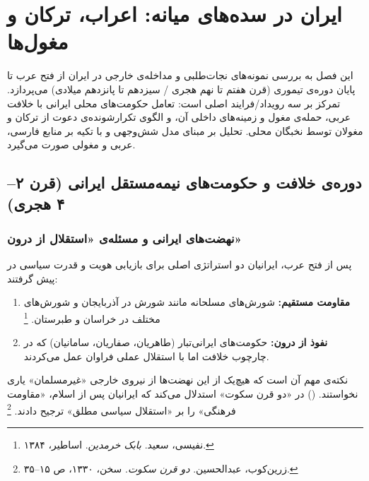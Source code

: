 \chapter{ایران در سده‌های میانه: اعراب، ترکان و مغول‌ها}
\label{ch:medieval-iran}

\begin{tcolorbox}[mybox, title={چکیده‌ی فصل}]
این فصل به بررسی نمونه‌های نجات‌طلبی و مداخله‌ی خارجی در ایران از فتح عرب تا پایان دوره‌ی تیموری (قرن هفتم تا نهم هجری / سیزدهم تا پانزدهم میلادی) می‌پردازد. تمرکز بر سه رویداد/فرایند اصلی است: تعامل حکومت‌های محلی ایرانی با خلافت عربی، حمله‌ی مغول و زمینه‌های داخلی آن، و الگوی تکرارشونده‌ی دعوت از ترکان و مغولان توسط نخبگان محلی. تحلیل بر مبنای مدل شش‌وجهی و با تکیه بر منابع فارسی، عربی و مغولی صورت می‌گیرد.
\end{tcolorbox}

\section{دوره‌ی خلافت و حکومت‌های نیمه‌مستقل ایرانی (قرن ۲–۴ هجری)}
\label{sec:ch05-caliphate}

\subsection{نهضت‌های ایرانی و مسئله‌ی «استقلال از درون»}
\label{subsec:ch05-iranian-movements}

پس از فتح عرب، ایرانیان دو استراتژی اصلی برای بازیابی هویت و قدرت سیاسی در پیش گرفتند:

\begin{enumerate}[nosep, label=\textbf{\arabic*.}]
  \item \textbf{مقاومت مستقیم:} شورش‌های مسلحانه مانند شورش  در آذربایجان و شورش‌های مختلف در خراسان و طبرستان.%
  \footnote{نفیسی، سعید. \textit{بابک خرمدین}. اساطیر، ۱۳۸۴.}
  \item \textbf{نفوذ از درون:} حکومت‌های ایرانی‌تبار (طاهریان، صفاریان، سامانیان) که در چارچوب خلافت اما با استقلال عملی فراوان عمل می‌کردند.
\end{enumerate}

نکته‌ی مهم آن است که هیچ‌یک از این نهضت‌ها از نیروی خارجی «غیرمسلمان» یاری نخواستند.  () در «دو قرن سکوت» استدلال می‌کند که ایرانیان پس از اسلام، «مقاومت فرهنگی» را بر «استقلال سیاسی مطلق» ترجیح دادند.%
\footnote{زرین‌کوب، عبدالحسین. \textit{دو قرن سکوت}. سخن، ۱۳۳۰، ص ۱۵--۳۵.}

